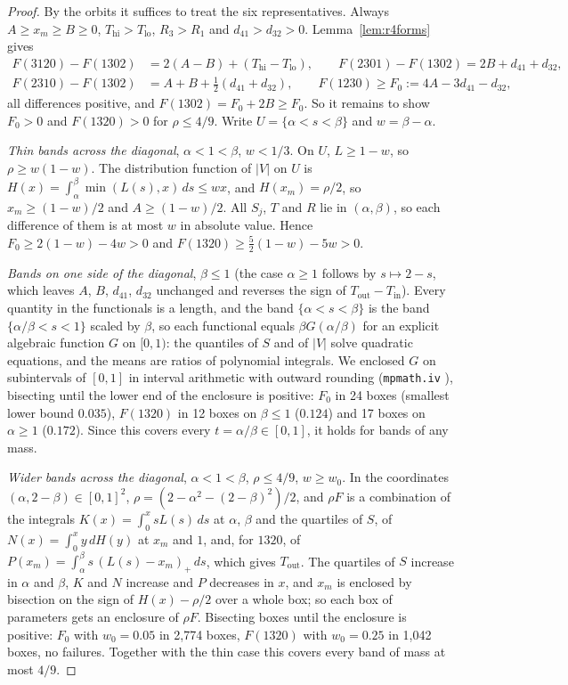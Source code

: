 \documentclass[11pt]{amsart}
\theoremstyle{definition}
\theoremstyle{remark}
\numberwithin{equation}{section}
\begin{document}
\begin{proof}
By the orbits it suffices to treat the six representatives. Always $A\ge x_m\ge B\ge0$, $T_{\mathrm{hi}}>T_{\mathrm{lo}}$,
$R_3>R_1$ and $d_{41}>d_{32}>0$. Lemma~\ref{lem:r4forms} gives
\begin{align*}
F(3120)-F(1302)&=2(A-B)+(T_{\mathrm{hi}}-T_{\mathrm{lo}}),\qquad F(2301)-F(1302)=2B+d_{41}+d_{32},\\
F(2310)-F(1302)&=A+B+\tfrac12(d_{41}+d_{32}),\qquad F(1230)\ge F_0:=4A-3d_{41}-d_{32},
\end{align*}
all differences positive, and $F(1302)=F_0+2B\ge F_0$. So it remains to show $F_0>0$ and $F(1320)>0$ for
$\rho\le4/9$. Write $U=\{\alpha<s<\beta\}$ and $w=\beta-\alpha$.

\emph{Thin bands across the diagonal}, $\alpha<1<\beta$, $w<1/3$. On $U$, $L\ge1-w$, so $\rho\ge w(1-w)$. The
distribution function of $|V|$ on $U$ is $H(x)=\int_\alpha^\beta\min(L(s),x)\,ds\le wx$, and $H(x_m)=\rho/2$, so
$x_m\ge(1-w)/2$ and $A\ge(1-w)/2$. All $S_j$, $T$ and $R$ lie in $(\alpha,\beta)$, so each difference of them is at
most $w$ in absolute value. Hence $F_0\ge2(1-w)-4w>0$ and $F(1320)\ge\frac52(1-w)-5w>0$.

\emph{Bands on one side of the diagonal}, $\beta\le1$ (the case $\alpha\ge1$ follows by $s\mapsto2-s$, which leaves $A$,
$B$, $d_{41}$, $d_{32}$ unchanged and reverses the sign of $T_{\mathrm{out}}-T_{\mathrm{in}}$). Every quantity in the
functionals is a length, and the band $\{\alpha<s<\beta\}$ is the band $\{\alpha/\beta<s<1\}$ scaled by $\beta$, so
each functional equals $\beta G(\alpha/\beta)$ for an explicit algebraic function $G$ on $[0,1)$: the quantiles of $S$
and of $|V|$ solve quadratic equations, and the means are ratios of polynomial integrals. We enclosed $G$ on
subintervals of $[0,1]$ in interval arithmetic with outward rounding (\texttt{mpmath.iv} \cite{mpmath}), bisecting until the lower
end of the enclosure is positive: $F_0$ in 24 boxes (smallest lower bound $0.035$), $F(1320)$ in 12 boxes on
$\beta\le1$ ($0.124$) and 17 boxes on $\alpha\ge1$ ($0.172$). Since this covers every
$t=\alpha/\beta\in[0,1]$, it holds for bands of any mass.

\emph{Wider bands across the diagonal}, $\alpha<1<\beta$, $\rho\le4/9$, $w\ge w_0$. In the coordinates $(\alpha,2-\beta)\in[0,1]^2$,
$\rho=(2-\alpha^2-(2-\beta)^2)/2$, and $\rho F$ is a combination of the integrals $K(x)=\int_0^xsL(s)\,ds$ at
$\alpha$, $\beta$ and the quartiles of $S$, of $N(x)=\int_0^xy\,dH(y)$ at $x_m$ and $1$, and, for $1320$, of
$P(x_m)=\int_\alpha^\beta s\,(L(s)-x_m)_+\,ds$, which gives $T_{\mathrm{out}}$. The quartiles of $S$ increase in $\alpha$
and $\beta$, $K$ and $N$ increase and $P$ decreases in $x$, and $x_m$ is enclosed by bisection on the sign of $H(x)-\rho/2$ over a whole box; so each
box of parameters gets an enclosure of $\rho F$. Bisecting boxes until the enclosure is positive: $F_0$ with $w_0=0.05$ in 2,774 boxes, $F(1320)$ with $w_0=0.25$ in 1,042 boxes, no failures.
Together with the thin case this covers every band of mass at most $4/9$.
\end{proof}
\end{document}
